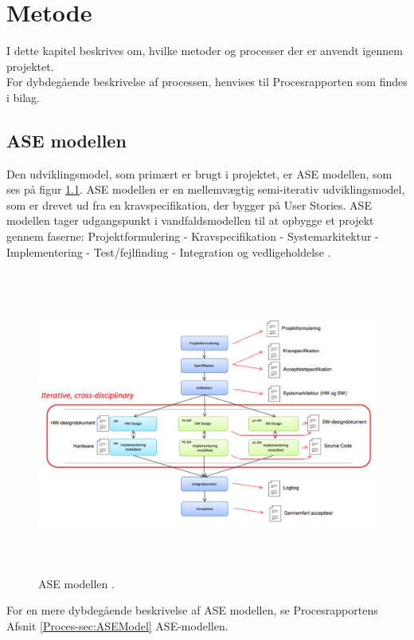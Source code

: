 \chapter{Metode}
I dette kapitel beskrives om, hvilke metoder og processer der er anvendt igennem projektet. \\
For dybdegående beskrivelse af processen, henvises til Procesrapporten som findes i bilag.

\section{ASE modellen}
Den udviklingsmodel, som primært er brugt i projektet, er ASE modellen, som ses på figur \ref{fig:ASE}. ASE modellen\cite{ASE} er en mellemvægtig semi-iterativ udviklingsmodel, som er drevet ud fra en kravspecifikation, der bygger på User Stories. ASE modellen tager udgangspunkt i vandfaldsmodellen til at opbygge et projekt gennem faserne: Projektformulering - Kravspecifikation - Systemarkitektur -  Implementering -  Test/fejlfinding -  Integration og vedligeholdelse \cite{ASE}.

\begin{figure} [!ht]
	\begin{center}
		\includegraphics[height=10cm, width=12cm]{Metode/ASEModellen}
	\end{center}
	\caption{ASE modellen \cite{ASE}.}
	\label{fig:ASE}
\end{figure}

For en mere dybdegående beskrivelse af ASE modellen, se Procesrapportens Afsnit \ref{Proces-sec:ASEModel} ASE-modellen. \\

